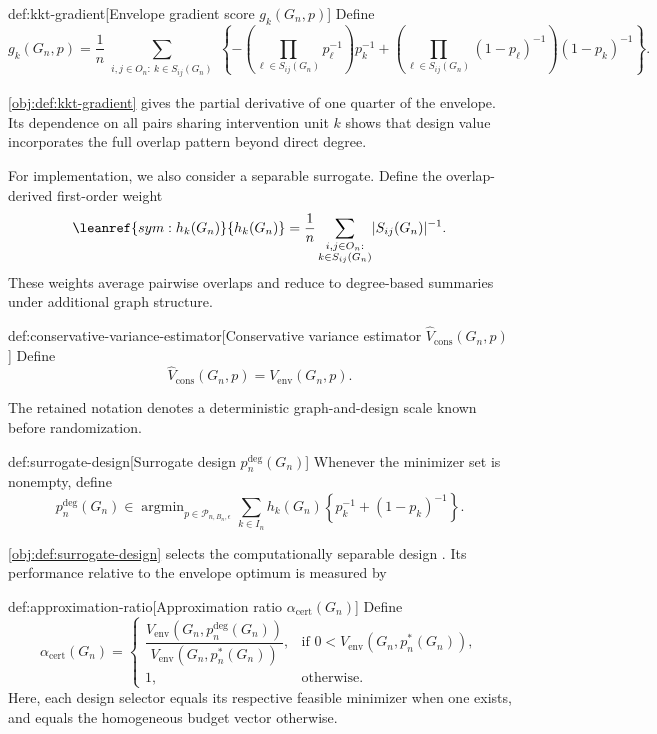\begin{definitionv}{def:kkt-gradient}[Envelope gradient score $g_k(G_n,p)$]
Define
\[
g_k(G_n,p)
=
\frac{1}{n}
\sum_{\substack{i,j\in O_n:\ k\in S_{ij}(G_n)}}
\left\{
-
\left(\prod_{\ell\in S_{ij}(G_n)}p_\ell^{-1}\right)p_k^{-1}
+
\left(\prod_{\ell\in S_{ij}(G_n)}(1-p_\ell)^{-1}\right)(1-p_k)^{-1}
\right\}.
\]
\end{definitionv}

\cref{obj:def:kkt-gradient} gives the partial derivative of one quarter of the envelope. Its dependence on all pairs sharing intervention unit \(k\) shows that design value incorporates the full overlap pattern beyond direct degree.

For implementation, we also consider a separable surrogate. Define the overlap-derived first-order weight
\[
\leanref{sym:h_k(G_n)}{\ensuremath{h_k(G_n)}}
=
\frac{1}{n}\sum_{\substack{i,j\in O_n:\\ k\in S_{ij}(G_n)}}
\lvert S_{ij}(G_n)\rvert^{-1}.
\]
These weights average pairwise overlaps and reduce to degree-based summaries under additional graph structure.

\begin{definitionv}{def:conservative-variance-estimator}[Conservative variance estimator $\widehat V_{\mathrm{cons}}(G_n,p)$]
Define
\[
\widehat V_{\mathrm{cons}}(G_n,p)
=
V_{\mathrm{env}}(G_n,p).
\]
\end{definitionv}

The retained notation  denotes a deterministic graph-and-design scale known before randomization.

\begin{definitionv}{def:surrogate-design}[Surrogate design $p_n^{\deg}(G_n)$]
Whenever the minimizer set is nonempty, define
\[
p_n^{\deg}(G_n)\in
\operatorname{argmin}_{p\in\mathcal P_{n,B_n,\epsilon}}
\sum_{k\in I_n} h_k(G_n)
\left\{p_k^{-1}+(1-p_k)^{-1}\right\}.
\]
\end{definitionv}

\cref{obj:def:surrogate-design} selects the computationally separable design . Its performance relative to the envelope optimum is measured by

\begin{definitionv}{def:approximation-ratio}[Approximation ratio $\alpha_{\mathrm{cert}}(G_n)$]
Define
\[
\alpha_{\mathrm{cert}}(G_n)=
\begin{cases}
\dfrac{V_{\mathrm{env}}\!\left(G_n,p_n^{\deg}(G_n)\right)}
{V_{\mathrm{env}}\!\left(G_n,p_n^*(G_n)\right)},
& \text{if }0<V_{\mathrm{env}}\!\left(G_n,p_n^*(G_n)\right),\\
1,
& \text{otherwise}.
\end{cases}
\]
Here, each design selector equals its respective feasible minimizer when one exists, and equals the homogeneous budget vector otherwise.
\end{definitionv}

